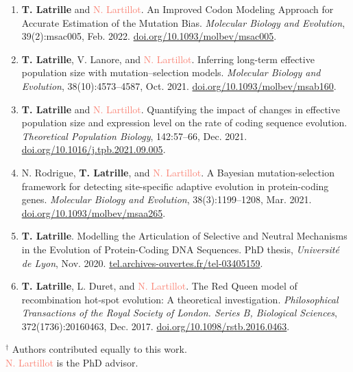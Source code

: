 \documentclass[11pt,a4paper]{moderncv}
\begin{document}
\begin{enumerate}
    \item \textbf{T. Latrille} and \textcolor{Salmon}{N. Lartillot}. An Improved Codon Modeling Approach for Accurate Estimation of the Mutation Bias. \textit{Molecular Biology and Evolution}, 39(2):msac005, Feb. 2022. \href{https://doi.org/10.1093/molbev/msac005}{doi.org/10.1093/molbev/msac005}.
    \item \textbf{T. Latrille}, V. Lanore, and \textcolor{Salmon}{N. Lartillot}. Inferring long-term effective population size with mutation–selection models. \textit{Molecular Biology and Evolution}, 38(10):4573–4587, Oct. 2021. \href{https://doi.org/10.1093/molbev/msab160}{doi.org/10.1093/molbev/msab160}.
    \item \textbf{T. Latrille} and \textcolor{Salmon}{N. Lartillot}. Quantifying the impact of changes in effective population size and expression level on the rate of coding sequence evolution. \textit{Theoretical Population Biology}, 142:57–66, Dec. 2021. \href{https://doi.org/10.1016/j.tpb.2021.09.005}{doi.org/10.1016/j.tpb.2021.09.005}.
    \item N. Rodrigue, \textbf{T. Latrille}, and \textcolor{Salmon}{N. Lartillot}. A Bayesian mutation-selection framework for detecting site-specific adaptive evolution in protein-coding genes. \textit{Molecular Biology and Evolution}, 38(3):1199–1208, Mar. 2021. \href{https://doi.org/10.1093/molbev/msaa265}{doi.org/10.1093/molbev/msaa265}.
    \item \textbf{T. Latrille}. Modelling the Articulation of Selective and Neutral Mechanisms in the Evolution of Protein-Coding DNA Sequences. PhD thesis, \textit{Université de Lyon}, Nov. 2020. \href{https://tel.archives-ouvertes.fr/tel-03405159}{tel.archives-ouvertes.fr/tel-03405159}.
    \item \textbf{T. Latrille}, L. Duret, and \textcolor{Salmon}{N. Lartillot}. The Red Queen model of recombination hot-spot evolution: A theoretical investigation. \textit{Philosophical Transactions of the Royal Society of London. Series B, Biological Sciences}, 372(1736):20160463, Dec. 2017. \href{https://doi.org/10.1098/rstb.2016.0463}{doi.org/10.1098/rstb.2016.0463}.
\end{enumerate}
\vspace{1em}
$^{\dag}$ Authors contributed equally to this work.\\
\textcolor{Salmon}{N. Lartillot} is the PhD advisor.
\end{document}
